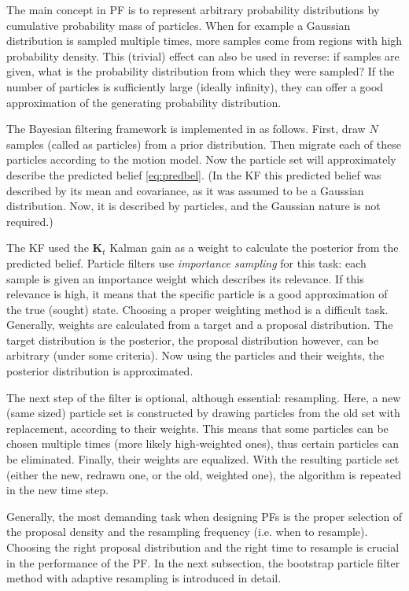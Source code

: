 The main concept in PF is to represent arbitrary probability distributions by cumulative probability mass of particles. When for example a Gaussian distribution is sampled multiple times, more samples come from regions with high probability density. This (trivial) effect can also be used in reverse: if samples are given, what is the probability distribution from which they were sampled? If the number of particles is sufficiently large (ideally infinity), they can offer a good approximation of the generating probability distribution.

The Bayesian filtering framework is implemented in as follows. First, draw $N$ samples (called as particles) from a prior distribution. Then migrate each of these particles according to the motion model. Now the particle set will approximately describe the predicted belief \eqref{eq:predbel}. (In the KF this predicted belief was described by its mean and covariance, as it was assumed to be a Gaussian distribution. Now, it is described by particles, and the Gaussian nature is not required.)

The KF used the $\mathbf{K}_t$ Kalman gain as a weight to calculate the posterior from the predicted belief. Particle filters use \emph{importance sampling} for this task: each sample is given an importance weight which describes its relevance. If this relevance is high, it means that the specific particle is a good approximation of the true (sought) state. Choosing a proper weighting method is a difficult task. Generally, weights are calculated from a target and a proposal distribution. The target distribution is the posterior, the proposal distribution however, can be arbitrary (under some criteria). Now using the particles and their weights, the posterior distribution is approximated.

The next step of the filter is optional, although essential: resampling. Here, a new (same sized) particle set is constructed by drawing particles from the old set with replacement, according to their weights. This means that some  particles can be chosen multiple times (more likely high-weighted ones), thus certain particles can be eliminated. Finally, their weights are equalized. With the resulting particle set (either the new, redrawn one, or the old, weighted one), the algorithm is repeated in the new time step.

Generally, the most demanding task when designing PFs is the proper selection of the proposal density and the resampling frequency (i.e. when to resample). Choosing the right proposal distribution and the right time to resample is crucial in the performance of the PF. In the next subsection, the bootstrap particle filter method with adaptive resampling is introduced in detail.
